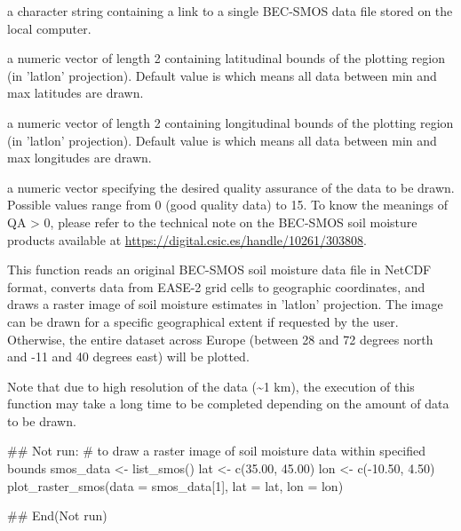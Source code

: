 \documentclass[a4paper]{book}
\begin{document}
%
\begin{Arguments}
\begin{ldescription}
\item[\code{data}] a character string containing a link to a single BEC-SMOS data
file stored on the local computer.

\item[\code{lat}] a numeric vector of length 2 containing latitudinal bounds of
the plotting region (in 'latlon' projection). Default value is 
which means all data between min and max latitudes are drawn.

\item[\code{lon}] a numeric vector of length 2 containing longitudinal bounds of
the plotting region (in 'latlon' projection). Default value is 
which means all data between min and max longitudes are drawn.

\item[\code{QA}] a numeric vector specifying the desired quality assurance of the
data to be drawn. Possible values range from 0 (good quality data) to 15.
To know the meanings of QA > 0, please refer to the technical note on the
BEC-SMOS soil moisture products available at
\url{https://digital.csic.es/handle/10261/303808}.
\end{ldescription}
\end{Arguments}
%
\begin{Details}
This function reads an original BEC-SMOS soil moisture data file in NetCDF
format, converts data from EASE-2 grid cells to geographic coordinates, and
draws a raster image of soil moisture estimates in 'latlon' projection. The
image can be drawn for a specific geographical extent if requested by the
user. Otherwise, the entire dataset across Europe (between 28 and 72 degrees
north and -11 and 40 degrees east) will be plotted.

Note that due to high resolution of the data (\textasciitilde{}1 km), the execution of this
function may take a long time to be completed depending on the amount of
data to be drawn.
\end{Details}
%
\begin{Examples}
\begin{ExampleCode}
## Not run: 
# to draw a raster image of soil moisture data within specified bounds
smos_data <- list_smos()
lat <- c(35.00, 45.00)
lon <- c(-10.50, 4.50)
plot_raster_smos(data = smos_data[1], lat = lat, lon = lon)

## End(Not run)

\end{ExampleCode}
\end{Examples}
\end{document}

